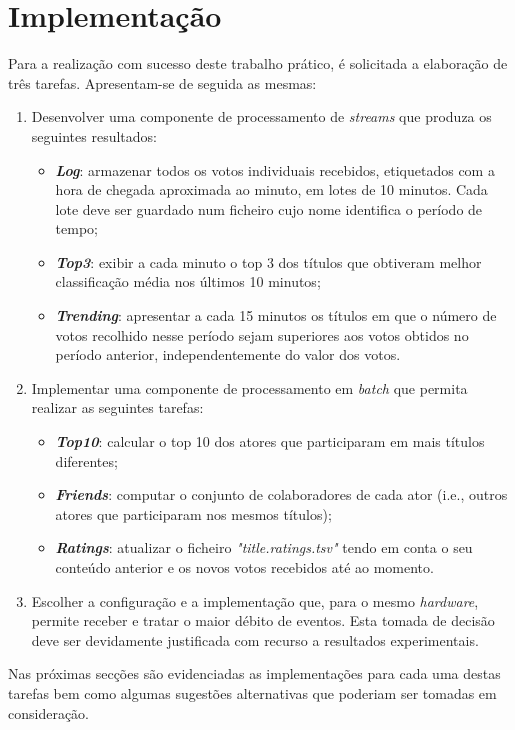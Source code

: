 \documentclass[a4paper]{report}
\begin{document}
\chapter{Implementação} \label{ch:Implementation}
\large {
	Para a realização com sucesso deste trabalho prático, é solicitada a elaboração de três tarefas. Apresentam-se de seguida as mesmas:
	\begin{enumerate}
		\item Desenvolver uma componente de processamento de \textit{streams} que produza os seguintes resultados:
		\begin{itemize}
			\item \textbf{\textit{Log}}: armazenar todos os votos individuais recebidos, etiquetados com a hora de chegada aproximada ao minuto, em lotes de 10 minutos. Cada lote deve ser guardado num ficheiro cujo nome identifica o período de tempo;
			\item \textbf{\textit{Top3}}: exibir a cada minuto o top 3 dos títulos que obtiveram melhor classificação média nos últimos 10 minutos;
			\item \textbf{\textit{Trending}}: apresentar a cada 15 minutos os títulos em que o número de votos recolhido nesse período sejam superiores aos votos obtidos no período anterior, independentemente do valor dos votos.
		\end{itemize}
		\item Implementar uma componente de processamento em \textit{batch} que permita realizar as seguintes tarefas:
		\begin{itemize}
			\item \textbf{\textit{Top10}}: calcular o top 10 dos atores que participaram em mais títulos diferentes;
			\item \textbf{\textit{Friends}}: computar o conjunto de colaboradores de cada ator (i.e., outros atores que participaram nos mesmos títulos);
			\item \textbf{\textit{Ratings}}: atualizar o ficheiro \textsl{"title.ratings.tsv"} tendo em conta o seu conteúdo anterior e os novos votos recebidos até ao momento.
		\end{itemize}
		\item Escolher a configuração e a implementação que, para o mesmo \textit{hardware}, permite receber e tratar o maior débito de eventos. Esta tomada de decisão deve ser devidamente justificada com recurso a resultados experimentais.
	\end{enumerate}
	
	Nas próximas secções são evidenciadas as implementações para cada uma destas tarefas bem como algumas sugestões alternativas que poderiam ser tomadas em consideração.

}
\end{document}
